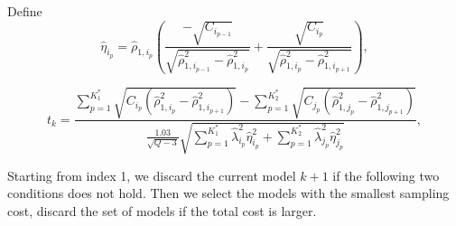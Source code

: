 \begin{theorem}
Define 
\[
\widehat\eta_{i_p} = \widehat\rho_{1,{i_p}} \left(\frac{-\sqrt{C_{i_{p-1}}}}{\sqrt{ \widehat\rho_{1,{i_{p-1}}}^2-\widehat\rho_{1,{i_{p}}}^2}}+\frac{\sqrt{C_{i_p}}}{\sqrt{ \widehat\rho_{1,{i_p}}^2-\widehat\rho_{1,{i_{p+1}}}^2}} \right),
\]

%
\[
t_k = \frac{\sum_{p=1}^{K_1^*}\sqrt{C_{i_p}(\widehat \rho_{1,i_p}^2-\widehat\rho_{1,i_{p+1}}^2)} - \sum_{p=1}^{K_2^*}\sqrt{C_{j_p}(\widehat \rho_{1,j_p}^2-\widehat\rho_{1,j_{p+1}}^2)}}{\frac{1.03}{\sqrt{Q-3}}\sqrt{\sum_{p=1}^{K_1^*} \widehat\lambda_{i_p}^2 \widehat\eta_{i_p}^2 + \sum_{p=1}^{K_2^*} \widehat\lambda_{j_p}^2 \widehat\eta_{j_p} ^2}}, 
\]
%

Starting from index 1, we discard the current model $k+1$ if  the following two conditions does not hold. Then we select the models with the smallest sampling cost, discard the set of models if the total cost is larger.
\end{theorem}









